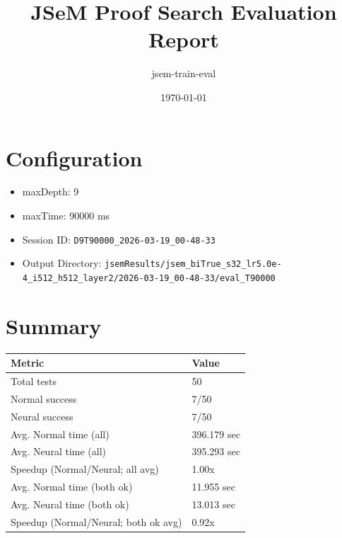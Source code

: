 \documentclass[a4paper,10pt]{article}
\title{JSeM Proof Search Evaluation Report}
\author{jsem-train-eval}
\date{\today}
\begin{document}
\maketitle

\section{Configuration}
\begin{itemize}
\item maxDepth: 9
\item maxTime: 90000 ms
\item Session ID: \texttt{D9T90000\_2026-03-19\_00-48-33}
\item Output Directory: \texttt{jsemResults/jsem\_biTrue\_s32\_lr5.0e-4\_i512\_h512\_layer2/2026-03-19\_00-48-33/eval\_T90000}
\end{itemize}

\section{Summary}
\begin{tabular}{ll}
\toprule
\textbf{Metric} & \textbf{Value} \\
\midrule
Total tests & 50 \\
Normal success & 7/50 \\
Neural success & 7/50 \\
\midrule
Avg. Normal time (all) & 396.179 sec \\
Avg. Neural time (all) & 395.293 sec \\
Speedup (Normal/Neural; all avg) & 1.00x \\
Avg. Normal time (both ok) & 11.955 sec \\
Avg. Neural time (both ok) & 13.013 sec \\
Speedup (Normal/Neural; both ok avg) & 0.92x \\
\bottomrule
\end{tabular}
\end{document}
